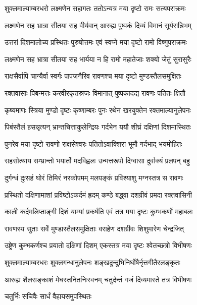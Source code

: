 \twolineshloka
{शुक्लमाल्याम्बरधरो लक्ष्मणेन सहागतः}
{ततोऽन्यत्र मया दृष्टो रामः सत्यपराक्रमः} %

\twolineshloka
{लक्ष्मणेन सह भ्रात्रा सीतया सह वीर्यवान्}
{आरुह्य पुष्पकं दिव्यं विमानं सूर्यसन्निभम्} %

\twolineshloka
{उत्तरां दिशमालोच्य प्रस्थितः पुरुषोत्तमः}
{एवं स्वप्ने मया दृष्टो रामो विष्णुपराक्रमः} %

\twolineshloka
{लक्ष्मणेन सह भ्रात्रा सीतया सह भार्यया}
{न हि रामो महातेजाः शक्यो जेतुं सुरासुरैः} %

\twolineshloka
{राक्षसैर्वापि चान्यैर्वा स्वर्गः पापजनैरिव}
{रावणश्च मया दृष्टो मुण्डस्तैलसमुक्षितः} %

\twolineshloka
{रक्तवासाः पिबन्मत्तः करवीरकृतस्रजः}
{विमानात् पुष्पकादद्य रावणः पतितः क्षितौ} %

\twolineshloka
{कृष्यमाणः स्त्रिया मुण्डो दृष्टः कृष्णाम्बरः पुनः}
{रथेन खरयुक्तेन रक्तमाल्यानुलेपनः} %

\twolineshloka
{पिबंस्तैलं हसन्नृत्यन् भ्रान्तचित्ताकुलेन्द्रियः}
{गर्दभेन ययौ शीघ्रं दक्षिणां दिशमास्थितः} %

\twolineshloka
{पुनरेव मया दृष्टो रावणो राक्षसेश्वरः}
{पतितोऽवाक्शिरा भूमौ गर्दभाद् भयमोहितः} %

\twolineshloka
{सहसोत्थाय सम्भ्रान्तो भयार्तो मदविह्वलः}
{उन्मत्तरूपो दिग्वासा दुर्वाक्यं प्रलपन् बहु} %

\twolineshloka
{दुर्गन्धं दुःसहं घोरं तिमिरं नरकोपमम्}
{मलपङ्कं प्रविश्याशु मग्नस्तत्र स रावणः} %

\twolineshloka
{प्रस्थितो दक्षिणामाशां प्रविष्टोऽकर्दमं ह्रदम्}
{कण्ठे बद्ध्वा दशग्रीवं प्रमदा रक्तवासिनी} %

\twolineshloka
{काली कर्दमलिप्ताङ्गी दिशं याम्यां प्रकर्षति}
{एवं तत्र मया दृष्टः कुम्भकर्णो महाबलः} %

\twolineshloka
{रावणस्य सुताः सर्वे मुण्डास्तैलसमुक्षिताः}
{वराहेण दशग्रीवः शिशुमारेण चेन्द्रजित्} %

\twolineshloka
{उष्ट्रेण कुम्भकर्णश्च प्रयातो दक्षिणां दिशम्}
{एकस्तत्र मया दृष्टः श्वेतच्छत्रो विभीषणः} %

\twolineshloka
{शुक्लमाल्याम्बरधरः शुक्लगन्धानुलेपनः}
{शङ्खदुन्दुभिनिर्घोषैर्नृत्तगीतैरलङ्कृतः} %

\twolineshloka
{आरुह्य शैलसङ्काशं मेघस्तनितनिःस्वनम्}
{चतुर्दन्तं गजं दिव्यमास्ते तत्र विभीषणः} %

\onelineshloka
{चतुर्भिः सचिवैः सार्धं वैहायसमुपस्थितः} %

